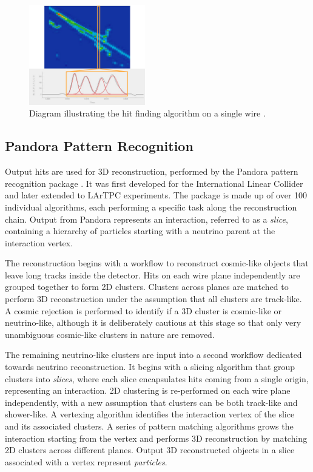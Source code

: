 \begin{figure}[htbp!] 
\centering    
\includegraphics[width=0.45\textwidth]{gaushit}
\caption[Hit Finding Diagram]{
Diagram illustrating the hit finding algorithm on a single wire \cite{EdPhD}.
}
\label{fig:gaushit}
\end{figure}

\subsection{Pandora Pattern Recognition}
\label{sec:pandora}

Output hits are used for 3D reconstruction, performed by the Pandora pattern recognition package \cite{pandora}.
It was first developed for the International Linear Collider and later extended to LArTPC experiments.
The package is made up of over 100 individual algorithms, each performing a specific task along the reconstruction chain.
Output from Pandora represents an interaction, referred to as a \textit{slice}, containing a hierarchy of particles starting with a neutrino parent at the interaction vertex.

The reconstruction begins with a workflow to reconstruct cosmic-like objects that leave long tracks inside the detector.
Hits on each wire plane independently are grouped together to form 2D clusters.
Clusters across planes are matched to perform 3D reconstruction under the assumption that all clusters are track-like.
A cosmic rejection is performed to identify if a 3D cluster is cosmic-like or neutrino-like, although it is deliberately cautious at this stage so that only very unambiguous cosmic-like clusters in nature are removed.

The remaining neutrino-like clusters are input into a second workflow dedicated towards neutrino reconstruction.
It begins with a slicing algorithm that group clusters into \textit{slices}, where each slice encapsulates hits coming from a single origin, representing an interaction.
2D clustering is re-performed on each wire plane independently, with a new assumption that clusters can be both track-like and shower-like.
A vertexing algorithm identifies the interaction vertex of the slice and its associated clusters.
A series of pattern matching algorithms grows the interaction starting from the vertex and performs 3D reconstruction by matching 2D clusters across different planes.
Output 3D reconstructed objects in a slice associated with a vertex represent \textit{particles}.

